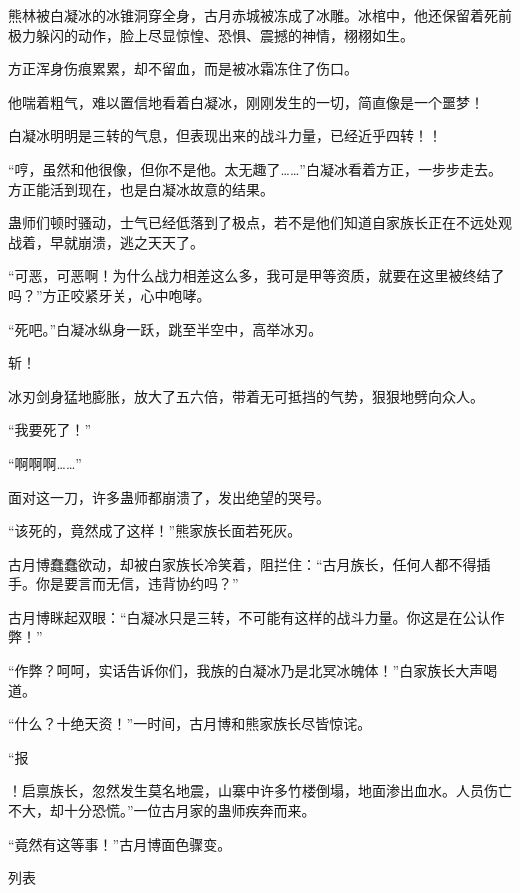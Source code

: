 \begin{this_body}
熊林被白凝冰的冰锥洞穿全身，古月赤城被冻成了冰雕。冰棺中，他还保留着死前极力躲闪的动作，脸上尽显惊惶、恐惧、震撼的神情，栩栩如生。

方正浑身伤痕累累，却不留血，而是被冰霜冻住了伤口。

他喘着粗气，难以置信地看着白凝冰，刚刚发生的一切，简直像是一个噩梦！

白凝冰明明是三转的气息，但表现出来的战斗力量，已经近乎四转！！

“哼，虽然和他很像，但你不是他。太无趣了……”白凝冰看着方正，一步步走去。方正能活到现在，也是白凝冰故意的结果。

蛊师们顿时骚动，士气已经低落到了极点，若不是他们知道自家族长正在不远处观战着，早就崩溃，逃之天天了。

“可恶，可恶啊！为什么战力相差这么多，我可是甲等资质，就要在这里被终结了吗？”方正咬紧牙关，心中咆哮。

“死吧。”白凝冰纵身一跃，跳至半空中，高举冰刃。

斩！

冰刃剑身猛地膨胀，放大了五六倍，带着无可抵挡的气势，狠狠地劈向众人。

“我要死了！”

“啊啊啊……”

面对这一刀，许多蛊师都崩溃了，发出绝望的哭号。

“该死的，竟然成了这样！”熊家族长面若死灰。

古月博蠢蠢欲动，却被白家族长冷笑着，阻拦住：“古月族长，任何人都不得插手。你是要言而无信，违背协约吗？”

古月博眯起双眼：“白凝冰只是三转，不可能有这样的战斗力量。你这是在公认作弊！”

“作弊？呵呵，实话告诉你们，我族的白凝冰乃是北冥冰魄体！”白家族长大声喝道。

“什么？十绝天资！”一时间，古月博和熊家族长尽皆惊诧。

“报

！启禀族长，忽然发生莫名地震，山寨中许多竹楼倒塌，地面渗出血水。人员伤亡不大，却十分恐慌。”一位古月家的蛊师疾奔而来。

“竟然有这等事！”古月博面色骤变。

列表

\end{this_body}

